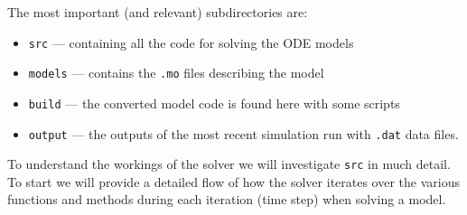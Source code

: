 \documentclass[10pt]{article}
\begin{document}
The most important (and relevant) subdirectories are:
\begin{itemize}
 \item {\tt{src}} --- containing all the code for solving the ODE models
  \item {\tt{models}} --- contains the {\tt{.mo}} files describing the model
   \item {\tt{build}} --- the converted model {} code is found here with some scripts
    \item {\tt{output}} --- the outputs of the most recent simulation run with {\tt{.dat}} data files.
\end{itemize}

To understand the workings of the solver we will investigate {\tt{src}} in much detail. To start we will provide a detailed flow of how the solver iterates over the various functions and methods during each iteration (time step) when solving a model.
\end{document}
